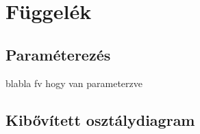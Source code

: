 \appendix
\chapter*{Függelék}
\setcounter{chapter}{6}  %
\setcounter{equation}{0} %
\setcounter{footnote}{0}

\section{Paraméterezés}\label{sect:parameterezes}

blabla fv hogy van parameterzve

\newpage
\section{Kibővített osztálydiagram}\label{sect:osztalydiagram}

